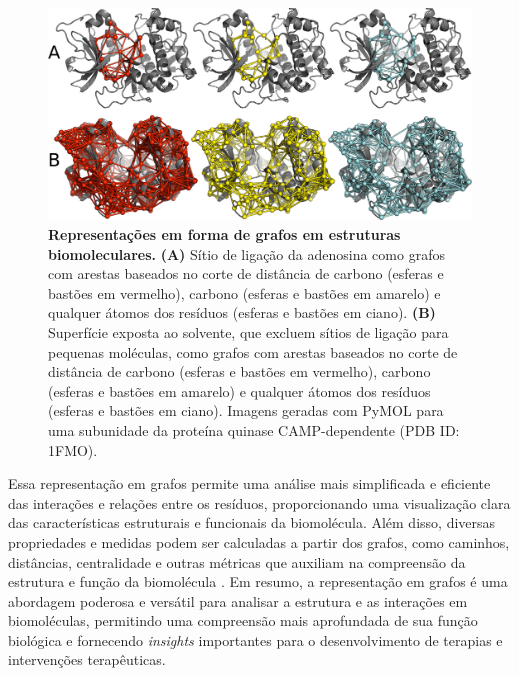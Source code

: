 \documentclass[Portugues]{phdquali}
\begin{document}

\begin{figure}[ht]
  \centerline{\includegraphics[scale=1.9]{images/graph-representation.png}}
  \caption[Representações em forma de grafos em estruturas biomoleculares]{\textbf{Representações em forma de grafos em estruturas biomoleculares.} \textbf{(A)} Sítio de ligação da adenosina como grafos com arestas baseados no corte de distância de carbono \textalpha\space (esferas e bastões em vermelho), carbono \textbeta\space (esferas e bastões em amarelo) e qualquer átomos dos resíduos (esferas e bastões em ciano). \textbf{(B)} Superfície exposta ao solvente, que excluem sítios de ligação para pequenas moléculas, como grafos com arestas baseados no corte de distância de carbono \textalpha\space (esferas e bastões em vermelho), carbono \textbeta\space (esferas e bastões em amarelo) e qualquer átomos dos resíduos (esferas e bastões em ciano). Imagens geradas com PyMOL para uma subunidade da proteína quinase CAMP-dependente (PDB ID: 1FMO).}
  \label{fig:serd-graph}
\end{figure}

Essa representação em grafos permite uma análise mais simplificada e eficiente das interações e relações entre os resíduos, proporcionando uma visualização clara das características estruturais e funcionais da biomolécula. Além disso, diversas propriedades e medidas podem ser calculadas a partir dos grafos, como caminhos, distâncias, centralidade e outras métricas que auxiliam na compreensão da estrutura e função da biomolécula \cite{majeed2020,vishveshwara2002,mason2007}. Em resumo, a representação em grafos é uma abordagem poderosa e versátil para analisar a estrutura e as interações em biomoléculas, permitindo uma compreensão mais aprofundada de sua função biológica e fornecendo \textit{insights} importantes para o desenvolvimento de terapias e intervenções terapêuticas.
\end{document}
